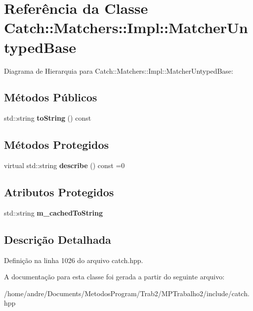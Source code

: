\hypertarget{classCatch_1_1Matchers_1_1Impl_1_1MatcherUntypedBase}{}\section{Referência da Classe Catch\+:\+:Matchers\+:\+:Impl\+:\+:Matcher\+Untyped\+Base}
\label{classCatch_1_1Matchers_1_1Impl_1_1MatcherUntypedBase}


Diagrama de Hierarquia para Catch\+:\+:Matchers\+:\+:Impl\+:\+:Matcher\+Untyped\+Base\+:
\subsection*{Métodos Públicos}
\begin{DoxyCompactItemize}
\item 
std\+::string {\bfseries to\+String} () const \hypertarget{classCatch_1_1Matchers_1_1Impl_1_1MatcherUntypedBase_a9667f989b08e52a1ce96c955456db8f9}{}\label{classCatch_1_1Matchers_1_1Impl_1_1MatcherUntypedBase_a9667f989b08e52a1ce96c955456db8f9}

\end{DoxyCompactItemize}
\subsection*{Métodos Protegidos}
\begin{DoxyCompactItemize}
\item 
virtual std\+::string {\bfseries describe} () const =0\hypertarget{classCatch_1_1Matchers_1_1Impl_1_1MatcherUntypedBase_a91d3a907dbfcbb596077df24f6e11fe2}{}\label{classCatch_1_1Matchers_1_1Impl_1_1MatcherUntypedBase_a91d3a907dbfcbb596077df24f6e11fe2}

\end{DoxyCompactItemize}
\subsection*{Atributos Protegidos}
\begin{DoxyCompactItemize}
\item 
std\+::string {\bfseries m\+\_\+cached\+To\+String}\hypertarget{classCatch_1_1Matchers_1_1Impl_1_1MatcherUntypedBase_a951095c462657e7097a9a6dc4dde813f}{}\label{classCatch_1_1Matchers_1_1Impl_1_1MatcherUntypedBase_a951095c462657e7097a9a6dc4dde813f}

\end{DoxyCompactItemize}


\subsection{Descrição Detalhada}


Definição na linha 1026 do arquivo catch.\+hpp.



A documentação para esta classe foi gerada a partir do seguinte arquivo\+:\begin{DoxyCompactItemize}
\item 
/home/andre/\+Documents/\+Metodos\+Program/\+Trab2/\+M\+P\+Trabalho2/include/catch.\+hpp\end{DoxyCompactItemize}
